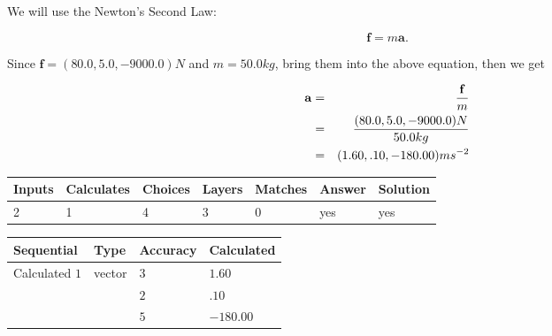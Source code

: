 \documentclass[12pt]{article}
\begin{document}
 
 
 
 
\noindent{}
 
 

We will use the Newton's Second Law:
 
\[
\mathbf{f}=m\mathbf{a}.
\]
 
Since $\mathbf{f}= %
(80.0 , 5.0 , -9000.0) N$
and $m= %
50.0kg$, bring them into the above equation, then we get
 
\begin{eqnarray*}
\mathbf{a}&=&\frac{\mathbf{f}}m  \\
&=&\frac{ %
(80.0 , 5.0 , -9000.0) N}{ %
50.0kg}  \\
&=& %
(1.60 , .10 , -180.00) ms^{-2}
\end{eqnarray*}
 
 
 
\noindent{}
 
 

 
 
\vspace{0.3in}
   
   
   
   
\noindent\begin{tabular}{|l|l|l|l|l|l|l|}
 \hline
Inputs & Calculates & Choices & Layers & Matches & Answer & Solution \\ \hline
           2 & 
           1 & 
           4
  & 
           3 & 
           0 & 
  yes & 
  yes 
  \\ \hline
 \end{tabular}
   
   
   
   
\noindent{}
   
   
  
  
\noindent\begin{tabular}{|l|l|l|l|}
\hline
 Sequential & Type & Accuracy & Calculated \\ 
\hline
 
 
  Calculated $           1$ & vector &  
  $           3 $ 
 &  $ 1.60 $ 
 \\    
  & & 
  $           2 $ 
 &  $ .10 $ 
 \\    
  & & 
  $           5 $ 
 &  $ -180.00 $ 
 \\  \hline  
 \end{tabular}
   
\end{document}
